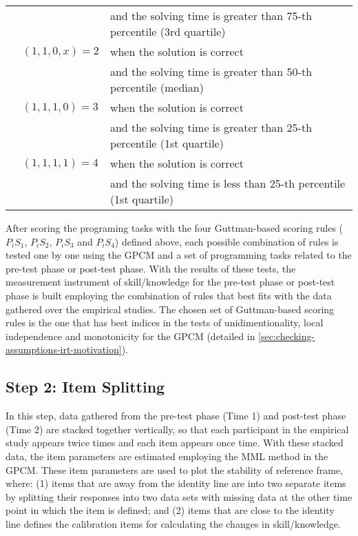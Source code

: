 \begin{center}
\begin{tabular}{lll}
& & and the solving time is greater than 75-th percentile (3rd quartile)\\
& $(1,1,0,x) = 2$ & when the solution is correct\\
& & and the solving time is greater than 50-th percentile (median)\\
& $(1,1,1,0) = 3$ & when the solution is correct\\
&  & and the solving time is greater than 25-th percentile (1st quartile)\\
& $(1,1,1,1) = 4$ & when the solution is correct\\
&  & and the solving time is less than 25-th percentile (1st quartile)\\
\end{tabular}
\end{center}

After scoring the programing tasks with the four Guttman-based scoring rules ($P_{i}S_{1}$, $P_{i}S_{2}$, $P_{i}S_{3}$ and $P_{i}S_{4}$) defined above, each possible combination of rules is tested one by one using the GPCM and a set of programming tasks related to the pre-test phase or post-test phase. With the results of these tests, the measurement instrument of skill/knowledge for the pre-test phase or post-test phase is built employing the combination of rules that best fits with the data gathered over the empirical studies. The chosen set of Guttman-based scoring rules is the one that has best indices in the tests of unidimentionality, local independence and monotonicity for the GPCM (detailed in \autoref{sec:checking-assumptions-irt-motivation}).

\subsection{Step 2: Item Splitting}

In this step, data gathered from the pre-test phase (Time 1) and post-test phase (Time 2) are stacked together vertically, so that each participant in the empirical study appears twice times and each item appears once time. With these stacked data, the item parameters are estimated employing the MML method in the GPCM. These item parameters are used to plot the stability of reference frame, where: (1) items that are away from the identity line are  into two separate items by splitting their responses into two data sets with missing data at the other time point in which the item is defined; and (2) items that are close to the identity line defines the calibration items for calculating the changes in skill/knowledge.


